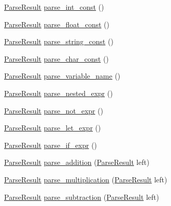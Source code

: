 \begin{DoxyCompactItemize}
\item 
\hyperlink{classfcal_1_1parser_1_1ParseResult}{Parse\+Result} \hyperlink{classfcal_1_1parser_1_1Parser_a8acdff8197580eb1d945072ff679306d}{parse\+\_\+int\+\_\+const} ()
\item 
\hyperlink{classfcal_1_1parser_1_1ParseResult}{Parse\+Result} \hyperlink{classfcal_1_1parser_1_1Parser_a86beefd5cab1bacded97977bd0785f31}{parse\+\_\+float\+\_\+const} ()
\item 
\hyperlink{classfcal_1_1parser_1_1ParseResult}{Parse\+Result} \hyperlink{classfcal_1_1parser_1_1Parser_ac87c57a45735cf4a811b4517e62001d5}{parse\+\_\+string\+\_\+const} ()
\item 
\hyperlink{classfcal_1_1parser_1_1ParseResult}{Parse\+Result} \hyperlink{classfcal_1_1parser_1_1Parser_ab8d667fc04e0cbea885b0def177a5b8c}{parse\+\_\+char\+\_\+const} ()
\item 
\hyperlink{classfcal_1_1parser_1_1ParseResult}{Parse\+Result} \hyperlink{classfcal_1_1parser_1_1Parser_a42a63ca82e8a3401f9e1e5cf6942a17f}{parse\+\_\+variable\+\_\+name} ()
\item 
\hyperlink{classfcal_1_1parser_1_1ParseResult}{Parse\+Result} \hyperlink{classfcal_1_1parser_1_1Parser_a230ffe70c18b3dad6d10ddec36a35e2f}{parse\+\_\+nested\+\_\+expr} ()
\item 
\hyperlink{classfcal_1_1parser_1_1ParseResult}{Parse\+Result} \hyperlink{classfcal_1_1parser_1_1Parser_a2349961f9d8868b8089ea13ae9e98fb4}{parse\+\_\+not\+\_\+expr} ()
\item 
\hyperlink{classfcal_1_1parser_1_1ParseResult}{Parse\+Result} \hyperlink{classfcal_1_1parser_1_1Parser_afe47685e472719748894c8991853de30}{parse\+\_\+let\+\_\+expr} ()
\item 
\hyperlink{classfcal_1_1parser_1_1ParseResult}{Parse\+Result} \hyperlink{classfcal_1_1parser_1_1Parser_a4f0fe50e12d5693818bf37fbbdda6ad4}{parse\+\_\+if\+\_\+expr} ()
\item 
\hyperlink{classfcal_1_1parser_1_1ParseResult}{Parse\+Result} \hyperlink{classfcal_1_1parser_1_1Parser_a491fe4bd93f17982da6242143a418521}{parse\+\_\+addition} (\hyperlink{classfcal_1_1parser_1_1ParseResult}{Parse\+Result} left)
\item 
\hyperlink{classfcal_1_1parser_1_1ParseResult}{Parse\+Result} \hyperlink{classfcal_1_1parser_1_1Parser_af32daaf2d2a1b933cc3de2c940ee48c4}{parse\+\_\+multiplication} (\hyperlink{classfcal_1_1parser_1_1ParseResult}{Parse\+Result} left)
\item 
\hyperlink{classfcal_1_1parser_1_1ParseResult}{Parse\+Result} \hyperlink{classfcal_1_1parser_1_1Parser_a2a7d7d74a714bb560017b15e745cf36e}{parse\+\_\+subtraction} (\hyperlink{classfcal_1_1parser_1_1ParseResult}{Parse\+Result} left)

\end{DoxyCompactItemize}

